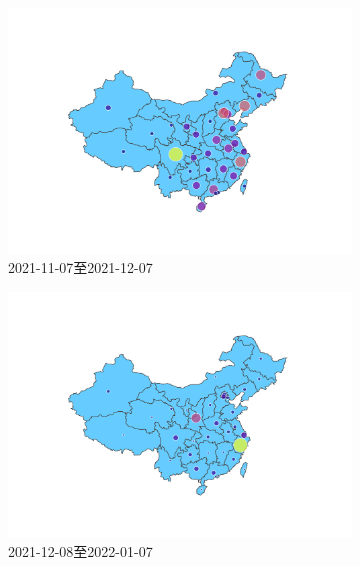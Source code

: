 \documentclass[UTF8]{ctexart}
\begin{document}
\begin{figure}[!ht]
    \begin{subfigure}[b]{0.3\textwidth}
         \centering
         \includegraphics[width=\textwidth]{../figures/rumor_num_choropleth_0}
         \caption{2021-11-07至2021-12-07}
         \label{subfig:rumor_num_choropleth_0}
     \end{subfigure}
     \hfill
     \begin{subfigure}[b]{0.3\textwidth}
         \centering
         \includegraphics[width=\textwidth]{../figures/rumor_num_choropleth_1}
         \caption{2021-12-08至2022-01-07}
         \label{subfig:rumor_num_choropleth_1}
     \end{subfigure}
     \hfill
     \begin{subfigure}[b]{0.3\textwidth}

\end{subfigure}
\end{figure}
\end{document}
